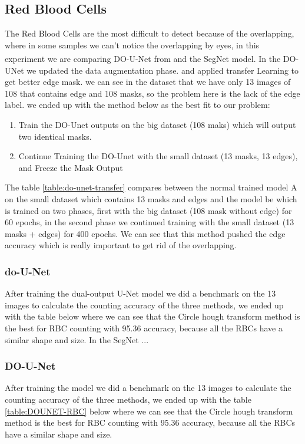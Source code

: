 \subsection{Red Blood Cells}
The Red Blood Cells are the most difficult to detect because of the overlapping, where in some samples we can't notice the overlapping by eyes, in this experiment we are comparing DO-U-Net from \textsuperscript{\cite{10.1007/978-3-030-44584-3_31}} and the SegNet model.
In the DO-UNet we updated the data augmentation phase. and applied transfer Learning to get better edge mask. we can see in the dataset that we have only 13 images of 108 that contains edge and 108 masks, so the problem here is the lack of the edge label. we ended up with the method below as the best fit to our problem:
\begin{enumerate}
    \item Train the DO-Unet outputs on the big dataset (108 maks) which will output two identical masks.
    \item Continue Training the DO-Unet with the small dataset (13 masks, 13 edges), and Freeze the Mask Output
\end{enumerate}



The table \ref{table:do-unet-transfer} compares between the normal trained model A on the small dataset which contains 13 masks and edges and the model be which is trained on two phases, first with the big dataset (108 mask without edge) for 60 epochs, in the second phase we continued training with the small dataset (13 masks + edges) for 400 epochs.
We can see that this method pushed the edge accuracy which is really important to get rid of the overlapping.

\subsubsection{do-U-Net}
After training the dual-output U-Net model we did a benchmark on the 13 images to calculate the counting accuracy of the three methods, we ended up with the table below where we can see that the Circle hough transform method is the best for RBC counting with 95.36 accuracy, because all the RBCs have a similar shape and size.
In the SegNet ... %

\subsubsection{DO-U-Net}
After training the model we did a benchmark on the 13 images to calculate the counting accuracy of the three methods, we ended up with the table \ref{table:DOUNET-RBC} below where we can see that the Circle hough transform method is the best for RBC counting with 95.36 accuracy, because all the RBCs have a similar shape and size.

